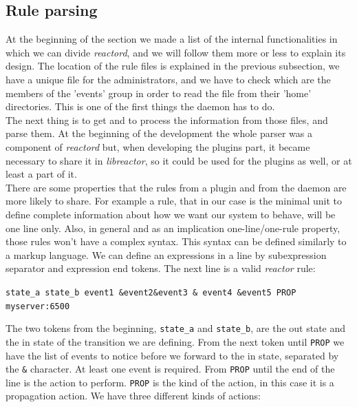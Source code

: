\subsection{Rule parsing}
\label{sec:rparser}
At the beginning of the section we made a list of the internal functionalities in which we can divide \emph{reactord}, and we will follow 
them more or less to explain its design. The location of the rule files is explained in the previous subsection, we have a unique file for 
the administrators, and we have to check which are the members of the 'events' group in order to read the file from their 'home' 
directories. This is one of the first things the daemon has to do.\\
The next thing is to get and to process the information from those files, and parse them. At the beginning of the development the whole 
parser was a component of \emph{reactord} but, when developing the plugins part, it became necessary to share it in \emph{libreactor}, 
so it could be used for the plugins as well, or at least a part of it.\\
There are some properties that the rules from a plugin and from the daemon are more likely to share. For example a rule, that in our case
is the minimal unit to define complete information about how we want our system to behave, will be one line only. Also, in general
and as an implication one-line/one-rule property, those rules won't have a complex syntax. This syntax can be defined similarly to a markup
language. We can define an expressions in a line by subexpression separator and expression end tokens. The next line is a valid 
\emph{reactor} rule:
\begin{center}
  \texttt{state\_a state\_b event1 \&event2\&event3 \& event4 \&event5 PROP myserver:6500\\}
\end{center}
The two tokens from the beginning, \texttt{state\_a} and \texttt{state\_b}, are the out state and the in state of the transition we are
defining. From the next token until \texttt{PROP} we have the list of events to notice before we forward to the in state, separated by the
\texttt{\&} character. At least one event is required. From \texttt{PROP} until the end of the line is the action to perform. \texttt{PROP}
is the kind of the action, in this case it is a propagation action. We have three different kinds of actions:
